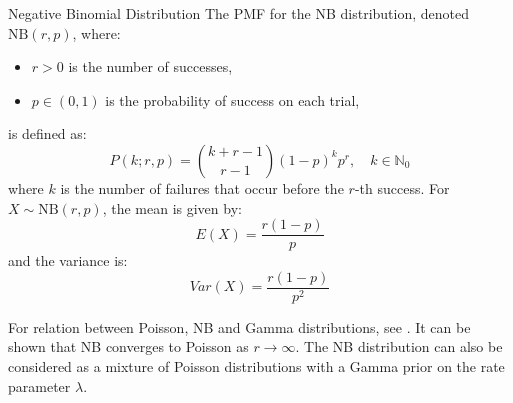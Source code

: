 \begin{note}
    {Negative Binomial Distribution}\label{note:negative-binomial-distribution}
    The \gls{PMF} for the \gls{NB} distribution, denoted $\text{NB}(r, p)$, where:
    \begin{itemize}
        \item $r > 0$ is the number of successes,
        \item $p \in (0, 1)$ is the probability of success on each trial,
    \end{itemize}
    is defined as:
    \begin{equation}\label{eq:nb-pmf}
        P(k; r, p) = \binom{k+r-1}{r-1} (1-p)^k p^r, \quad k \in \mathbb{N}_0
    \end{equation}
    where $k$ is the number of failures that occur before the $r$-th success.
    For $X \sim \text{NB}(r, p)$, the mean is given by:
        \begin{equation}
            E(X) = \frac{r(1-p)}{p}
        \end{equation}
        and the variance is:
        \begin{equation}
            Var(X) = \frac{r(1-p)}{p^2}
        \end{equation}

\end{note}


For relation between Poisson, \gls{NB} and Gamma distributions, see \cite{barry2020gamma}. It can be shown that \gls{NB} converges to Poisson as $r \to \infty$. The \gls{NB} distribution can also be considered as a mixture of Poisson distributions with a Gamma prior on the rate parameter $\lambda$.



